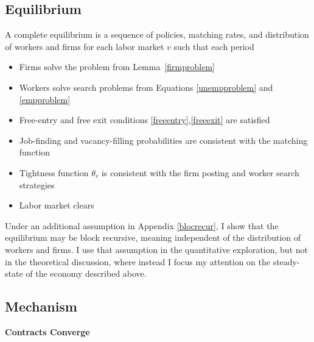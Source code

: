\subsection{Equilibrium}
A complete equilibrium is a sequence of policies, matching rates, and distribution of workers and firms for each labor market $v$ such that each period
\begin{itemize}
    \item Firms solve the problem from Lemma~\ref{firmproblem}
    \item Workers solve search problems from Equations \ref{unempproblem} and \ref{empproblem}
    \item Free-entry  and free exit conditions \ref{freeentry},\ref{freeexit}  are satisfied
    \item Job-finding and vacancy-filling probabilities are consistent with the matching function
    \item Tightness function $\theta_v$ is consistent with the firm posting and worker search strategies
    \item Labor market clears
\end{itemize}
Under an additional assumption in Appendix \ref{blocrecur}, I show that the equilibrium may be block recursive, meaning independent of the distribution of workers and firms. I use that assumption in the quantitative exploration, but not in the theoretical discussion, where instead I focus my attention on the steady-state of the economy described above.

\subsection{Mechanism}

\textbf{Contracts Converge}

